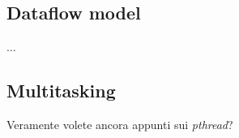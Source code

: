 \subsection{Dataflow model}
$\dots$
\subsection{Multitasking}
Veramente volete ancora appunti sui \emph{pthread}?
